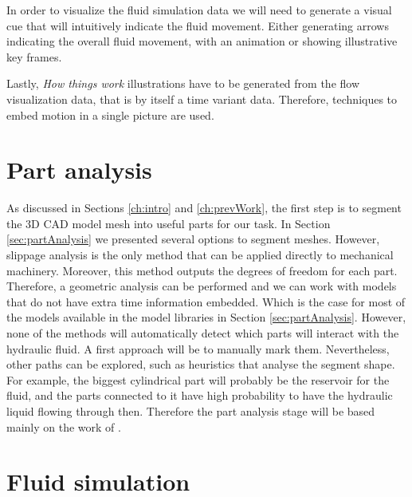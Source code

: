 In order to visualize the fluid simulation data we will need to generate a visual cue that will intuitively indicate the fluid movement.
Either generating arrows indicating the overall fluid movement, with an animation or showing illustrative key frames.

Lastly, \textit{How things work} illustrations have to be generated from the flow visualization data, that is by itself a time variant data.
Therefore, techniques to embed motion in a single picture are used.


\section{Part analysis}

As discussed in Sections \ref{ch:intro} and \ref{ch:prevWork}, the first step is to segment the 3D CAD model mesh into useful parts for our task.
In Section \ref{sec:partAnalysis} we presented several options to segment meshes.
However, slippage analysis is the only method that can be applied directly to mechanical machinery.
Moreover, this method outputs the degrees of freedom for each part. 
Therefore, a geometric analysis can be performed and we can work with models that do not have extra time information embedded.
Which is the case for most of the models available in the model libraries in Section \ref{sec:partAnalysis}.
However, none of the methods will automatically detect which parts will interact with the hydraulic fluid.
A first approach will be to manually mark them.
Nevertheless, other paths can be explored, such as heuristics that analyse the segment shape.
For example, the biggest cylindrical part will probably be the reservoir for the fluid, and the parts connected to it have high probability to have the hydraulic liquid flowing through then.
Therefore the part analysis stage will be based mainly on the work of \cite{Yi2014}.


\section{Fluid simulation}

